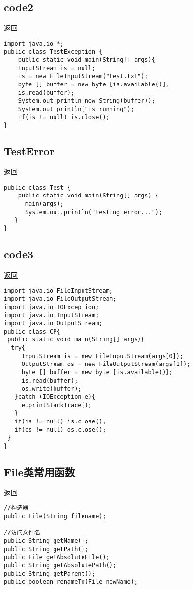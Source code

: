 \documentclass[a4paper,10pt]{article}
\begin{document}
\begin{CJK}{UTF8}{gbsn}
\subsection{code2}\hypertarget{code2}{}\hyperlink{ex}{返回}
\begin{lstlisting}
import java.io.*;
public class TestException {
    public static void main(String[] args){
	InputStream is = null;
	is = new FileInputStream("test.txt");
	byte [] buffer = new byte [is.available()];
	is.read(buffer);
	System.out.println(new String(buffer));
	System.out.println("is running");
	if(is != null) is.close();
}
\end{lstlisting}
\subsection{TestError}\hypertarget{error}{}\hyperlink{rerror}{返回}
\begin{lstlisting}
public class Test {
    public static void main(String[] args) {
      main(args); 
      System.out.println("testing error...");
   }
}
\end{lstlisting}
\newpage
\subsection{code3}\hypertarget{copy}{}\hyperlink{rcopy}{返回}
\begin{lstlisting}
import java.io.FileInputStream;
import java.io.FileOutputStream;
import java.io.IOException;
import java.io.InputStream;
import java.io.OutputStream;
public class CP{
 public static void main(String[] args){
  try{
     InputStream is = new FileInputStream(args[0]);
     OutputStream os = new FileOutputStream(args[1]);
     byte [] buffer = new byte [is.available()];
     is.read(buffer);
     os.write(buffer);	
   }catch (IOException e){
     e.printStackTrace();    
   }
   if(is != null) is.close();
   if(os != null) os.close();
 }
}
\end{lstlisting}



\newpage
\hypertarget{File}{}\subsection{File类常用函数}\hyperlink{FileOt}{返回}
\begin{lstlisting}
//构造器
public File(String filename);

//访问文件名
public String getName();
public String getPath();
public File getAbsoluteFile();
public String getAbsolutePath();
public String getParent();
public boolean renameTo(File newName);


\end{lstlisting}
\end{CJK}
\end{document}
